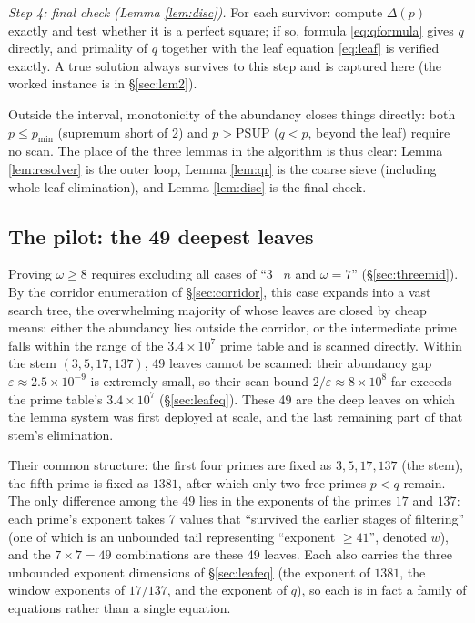 \documentclass[11pt]{article}
\theoremstyle{remark}
\newcommand{\PSUP}{\mathrm{PSUP}}
\begin{document}
\emph{Step 4: final check (Lemma \ref{lem:disc}).} For each survivor: compute $\Delta(p)$ exactly and test whether it is a perfect square; if so, formula \eqref{eq:qformula} gives $q$ directly, and primality of $q$ together with the leaf equation \eqref{eq:leaf} is verified exactly. A true solution always survives to this step and is captured here (the worked instance is in \S\ref{sec:lem2}).

Outside the interval, monotonicity of the abundancy closes things directly: both $p \le p_{\min}$ (supremum short of 2) and $p > \PSUP$ ($q < p$, beyond the leaf) require no scan. The place of the three lemmas in the algorithm is thus clear: Lemma \ref{lem:resolver} is the outer loop, Lemma \ref{lem:qr} is the coarse sieve (including whole-leaf elimination), and Lemma \ref{lem:disc} is the final check.

\subsection{The pilot: the 49 deepest leaves}\label{sec:49}

Proving $\omega \ge 8$ requires excluding all cases of ``$3 \mid n$ and $\omega = 7$'' (\S\ref{sec:threemid}). By the corridor enumeration of \S\ref{sec:corridor}, this case expands into a vast search tree, the overwhelming majority of whose leaves are closed by cheap means: either the abundancy lies outside the corridor, or the intermediate prime falls within the range of the $3.4 \times 10^7$ prime table and is scanned directly. Within the stem $(3, 5, 17, 137)$, 49 leaves cannot be scanned: their abundancy gap $\varepsilon \approx 2.5 \times 10^{-9}$ is extremely small, so their scan bound $2/\varepsilon \approx 8 \times 10^8$ far exceeds the prime table's $3.4 \times 10^7$ (\S\ref{sec:leafeq}). These 49 are the deep leaves on which the lemma system was first deployed at scale, and the last remaining part of that stem's elimination.

Their common structure: the first four primes are fixed as $3, 5, 17, 137$ (the stem), the fifth prime is fixed as $1381$, after which only two free primes $p < q$ remain. The only difference among the 49 lies in the exponents of the primes $17$ and $137$: each prime's exponent takes 7 values that ``survived the earlier stages of filtering'' (one of which is an unbounded tail representing ``exponent $\ge 41$'', denoted $w$), and the $7 \times 7 = 49$ combinations are these 49 leaves. Each also carries the three unbounded exponent dimensions of \S\ref{sec:leafeq} (the exponent of $1381$, the window exponents of $17/137$, and the exponent of $q$), so each is in fact a family of equations rather than a single equation.
\end{document}
